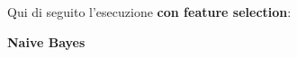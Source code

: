












Qui di seguito l'esecuzione \textbf{con feature selection}: \newline

\textbf{\Large Naive Bayes}

